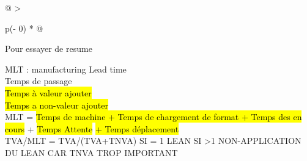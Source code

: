 \documentclass[
]{article}
\begin{document}
\begin{longtable}[]{@{}
  >{\raggedright\arraybackslash}p{(\columnwidth - 0\tabcolsep) * }@{}}
\toprule\noalign{}
\begin{minipage}[b]{\linewidth}\raggedright
\begin{center}
\end{center}

\begin{center}
\end{center}

Pour essayer de resume

MLT : manufacturing Lead time\\
Temps de passage\\
\hl{Temps à valeur ajouter}\\
\hl{Temps a non-valeur ajouter}\\
MLT = \hl{Temps de machine + Temps de chargement de format + Temps des
en cours} + \hl{Temps Attente} \hl{+ Temps déplacement}\\
TVA/MLT = TVA/(TVA+TNVA) SI = 1 LEAN SI \textgreater1 NON-APPLICATION DU
LEAN CAR TNVA TROP IMPORTANT
\end{minipage} \\
\midrule\noalign{}
\endhead
\bottomrule\noalign{}
\endlastfoot
\end{longtable}
\end{document}
